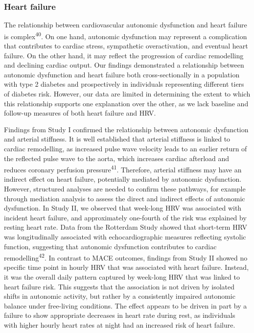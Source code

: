 \documentclass[
  a4paper,
  headsepline=true,
  open=any]{scrbook}
\begin{document}
\hypertarget{heart-failure-1}{%
\subsubsection{Heart failure}\label{heart-failure-1}}

The relationship between cardiovascular autonomic dysfunction and heart
failure is complex\textsuperscript{40}. On one hand, autonomic
dysfunction may represent a complication that contributes to cardiac
stress, sympathetic overactivation, and eventual heart failure. On the
other hand, it may reflect the progression of cardiac remodelling and
declining cardiac output. Our findings demonstrated a relationship
between autonomic dysfunction and heart failure both cross-sectionally
in a population with type 2 diabetes and prospectively in individuals
representing different tiers of diabetes risk. However, our data are
limited in determining the extent to which this relationship supports
one explanation over the other, as we lack baseline and follow-up
measures of both heart failure and HRV.

Findings from Study I confirmed the relationship between autonomic
dysfunction and arterial stiffness. It is well established that arterial
stiffness is linked to cardiac remodelling, as increased pulse wave
velocity leads to an earlier return of the reflected pulse wave to the
aorta, which increases cardiac afterload and reduces coronary perfusion
pressure\textsuperscript{41}. Therefore, arterial stiffness may have an
indirect effect on heart failure, potentially mediated by autonomic
dysfunction. However, structured analyses are needed to confirm these
pathways, for example through mediation analysis to assess the direct
and indirect effects of autonomic dysfunction. In Study II, we observed
that week-long HRV was associated with incident heart failure, and
approximately one-fourth of the risk was explained by resting heart
rate. Data from the Rotterdam Study showed that short-term HRV was
longitudinally associated with echocardiographic measures reflecting
systolic function, suggesting that autonomic dysfunction contributes to
cardiac remodelling\textsuperscript{42}. In contrast to MACE outcomes,
findings from Study II showed no specific time point in hourly HRV that
was associated with heart failure. Instead, it was the overall daily
pattern captured by week-long HRV that was linked to heart failure risk.
This suggests that the association is not driven by isolated shifts in
autonomic activity, but rather by a consistently impaired autonomic
balance under free-living conditions. The effect appears to be driven in
part by a failure to show appropriate decreases in heart rate during
rest, as individuals with higher hourly heart rates at night had an
increased risk of heart failure.
\end{document}
